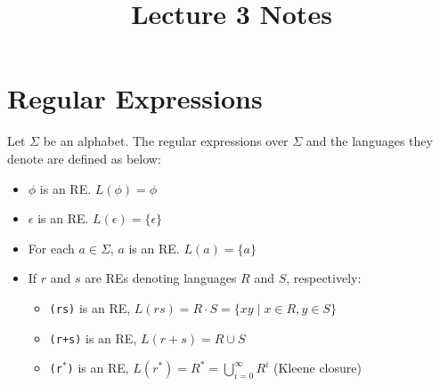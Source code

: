 \documentclass[12pt,a4paper]{article}
\title{Lecture 3 Notes}
\author{}
\date{}
\begin{document}
\maketitle

\section*{Regular Expressions}
Let $\Sigma$ be an alphabet. The regular expressions over $\Sigma$ and the languages they denote are defined as below:

\begin{itemize}
    \item $\phi$ is an RE. $L(\phi) = \phi$
    \item $\epsilon$ is an RE. $L(\epsilon) = \{\epsilon\}$
    \item For each $a \in \Sigma$, $a$ is an RE. $L(a) = \{a\}$
    \item If $r$ and $s$ are REs denoting languages $R$ and $S$, respectively:
    \begin{itemize}
        \item \texttt{(rs)} is an RE, $L(rs) = R \cdot S = \{xy \mid x \in R, y \in S\}$
        \item \texttt{(r+s)} is an RE, $L(r+s) = R \cup S$
        \item \texttt{(r$^*$)} is an RE, $L(r^*) = R^* = \bigcup_{i=0}^{\infty} R^i$ (Kleene closure)
    \end{itemize}
\end{itemize}
\end{document}
